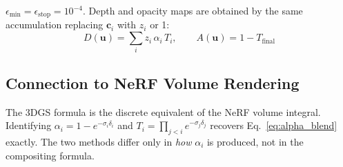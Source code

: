 $\epsilon_{\min} = \epsilon_{\text{stop}} = 10^{-4}$. Depth and opacity maps
are obtained by the same accumulation replacing $\mathbf{c}_i$ with $z_i$ or 1:
\begin{equation}
  D(\mathbf{u}) = \sum_i z_i\,\alpha_i\,T_i, \qquad
  A(\mathbf{u}) = 1 - T_{\text{final}}
\end{equation}

\subsection{Connection to NeRF Volume Rendering}

The 3DGS formula is the discrete equivalent of the NeRF volume integral.
Identifying $\alpha_i = 1 - e^{-\sigma_i\delta_i}$ and
$T_i = \prod_{j<i}e^{-\sigma_j\delta_j}$ recovers Eq.~\eqref{eq:alpha_blend}
exactly. The two methods differ only in \emph{how} $\alpha_i$ is produced, not
in the compositing formula.
